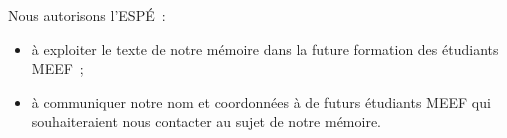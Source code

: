 \begin{abstract}
\lipsum[4]
\end{abstract}

Nous autorisons l'ESPÉ :
\begin{itemize}
\item à exploiter le texte de notre mémoire dans la future formation des étudiants MEEF ;
\item à communiquer notre nom et coordonnées à de futurs étudiants MEEF qui souhaiteraient
nous contacter au sujet de notre mémoire.
\end{itemize}
